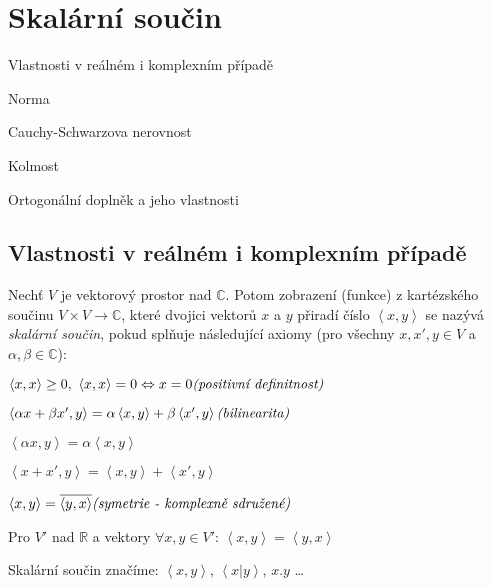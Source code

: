 \section{Skalární součin}

\begin{pozadavky}
\begin{pitemize}
	\item Vlastnosti v reálném i komplexním případě
	\item Norma
	\item Cauchy-Schwarzova nerovnost
	\item Kolmost
	\item Ortogonální doplněk a jeho vlastnosti
\end{pitemize}
\end{pozadavky}

\subsection{Vlastnosti v reálném i komplexním případě}
\begin{definice}
Nechť $V$ je vektorový prostor nad $\mathbb{C}$. Potom zobrazení (funkce) z kartézského součinu $V \times V \rightarrow \mathbb{C}$, které dvojici vektorů $x$ a $y$ přiradí číslo $\left<x,y\right>$ se nazývá \emph{skalární součin}, pokud splňuje následující axiomy (pro všechny $x, x', y \in V$ a $\alpha, \beta \in \mathbb{C}$):
\begin{penumerate}
	\item $\left<x,x\right> \ge 0, \,\, \left<x,x\right> =0 \Leftrightarrow x = 0 \hfill \textit{(positivní definitnost)}$
	\item $\left<\alpha x+\beta x', y\right> = \alpha \left<x,y\right> + \beta \left<x',y\right> \hfill \textit{(bilinearita)}$
		\begin{penumerate}
			\item $\left<\alpha x,y\right> = \alpha \left<x,y\right>$
			\item $\left<x+x',y\right> = \left<x,y\right> + \left<x',y\right>$
		\end{penumerate}
	\item $\left<x,y\right> = \overline{\left<y,x\right>} \hfill \textit{(symetrie - komplexně sdružené)}$ \\
		\begin{poznamka}
			Pro $V'$ nad $\mathbb{R}$ a vektory $\forall x,y \in V'$: $\left<x,y\right>=\left<y,x\right>$
		\end{poznamka}
\end{penumerate}

Skalární součin značíme: $\left<x,y\right>$, $\left<x|y\right>$, $x.y$ \dots
\end{definice}

